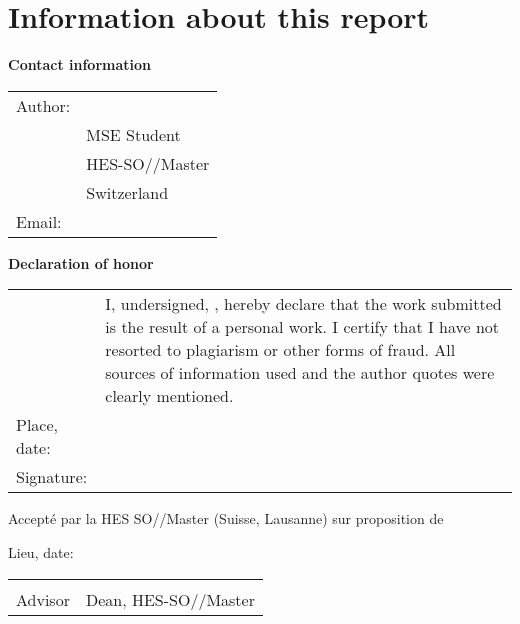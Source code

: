 \chapter*{Information about this report}

\vspace{\fill}

\textbf{Contact information}

\begin{tabularx}{\textwidth}{N{2.5cm}X}
	Author:	 & \AuthorFirstName \AuthorLastName \\
	& MSE Student \\
	& HES-SO//Master \\
	& Switzerland \\
	Email: & \email{\AuthorEmail}
\end{tabularx}

\vspace{\fill}

\textbf{Declaration of honor}

{\renewcommand{\arraystretch}{2}
\begin{tabularx}{\textwidth}{N{2.5cm}X}
	& I, undersigned, \Author, hereby declare that the work submitted is
	the result of a personal work. I certify that I have not resorted to
	plagiarism or other forms of fraud. All sources of information used and the
	author quotes were clearly mentioned. \\
	Place, date: & \underline{\hspace{7cm}} \\
	Signature: & \underline{\hspace{7cm}}
\end{tabularx}
}

\vspace{\fill}


Accepté par la HES SO//Master (Suisse, Lausanne) sur proposition de

\vspace{0.5cm}

\Advisor %


\vspace{1cm}

Lieu, date: \underline{\hspace{8cm}}

\vspace{3cm}

{ \renewcommand{\arraystretch}{1.5}
\begin{tabularx}{\textwidth}{X X}
	\Advisor  & \Dean\\
	Advisor   & Dean, HES-SO//Master\\
\end{tabularx}
}